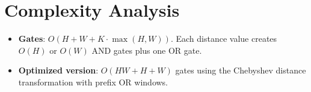 \documentclass[11pt,a4paper]{article}
\begin{document}
\section{Complexity Analysis}
\begin{itemize}
  \item \textbf{Gates}: $O(H + W + K \cdot \max(H, W))$. Each distance value creates $O(H)$ or $O(W)$ AND gates plus one OR gate.
  \item \textbf{Optimized version}: $O(HW + H + W)$ gates using the Chebyshev distance transformation with prefix OR windows.
\end{itemize}
\end{document}
